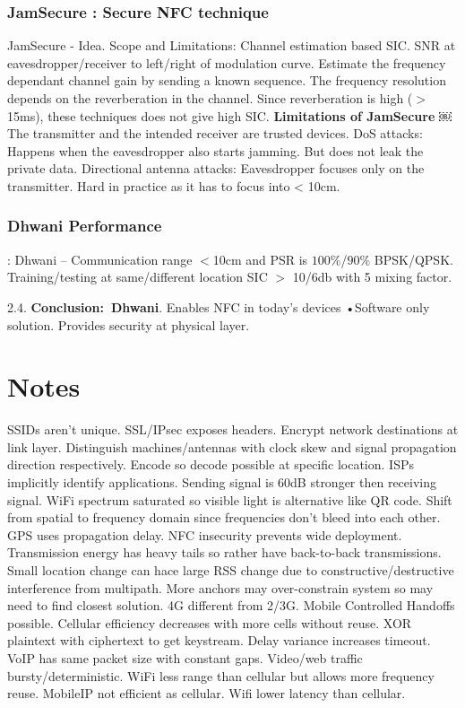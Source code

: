 \documentclass[9pt]{extarticle}
\begin{document}
\begin{multicols}{2}
\subsubsection{JamSecure : Secure NFC technique}

JamSecure - Idea. Scope and Limitations: Channel estimation based SIC. SNR at eavesdropper/receiver to left/right of modulation curve. Estimate the frequency dependant channel gain by sending a known sequence. The frequency resolution depends on the reverberation in the channel. Since reverberation is high ($>$15ms), these techniques does not give high SIC. \textbf{Limitations of JamSecure} ￼The transmitter and the intended receiver are trusted devices.
DoS attacks: Happens when the eavesdropper also starts jamming. But does not leak the private data. Directional antenna attacks: Eavesdropper focuses only on the transmitter. Hard in practice as it has to focus into < 10cm.

\subsubsection{Dhwani Performance}: Dhwani – Communication range $<$10cm and PSR is $100\%$/$90\%$ BPSK/QPSK. Training/testing at same/different location SIC $>$ 10/6db with 5 mixing factor.

2.4. \textbf{Conclusion:\ Dhwani}. Enables NFC in today’s devices •Software only solution. Provides security at physical layer.

\section{Notes}

SSIDs aren't unique. SSL/IPsec exposes headers. Encrypt network destinations at link layer. Distinguish machines/antennas with clock skew and signal propagation direction respectively. Encode so decode possible at specific location. ISPs implicitly identify applications. Sending signal is 60dB stronger then receiving signal. WiFi spectrum saturated so visible light is alternative like QR code. Shift from spatial to frequency domain since frequencies don't bleed into each other. GPS uses propagation delay. NFC insecurity prevents wide deployment. Transmission energy has heavy tails so rather have back-to-back transmissions. Small location change can hace large RSS change due to constructive/destructive interference from multipath. More anchors may over-constrain system so may need to find closest solution. 4G different from 2/3G. Mobile Controlled Handoffs  possible. Cellular efficiency decreases with more cells without reuse. XOR plaintext with ciphertext to get keystream. Delay variance increases timeout. VoIP has same packet size with constant gaps. Video/web traffic bursty/deterministic. WiFi less range than cellular but allows more frequency reuse. MobileIP not efficient as cellular. Wifi lower latency than cellular.

\end{multicols}
\end{document}
